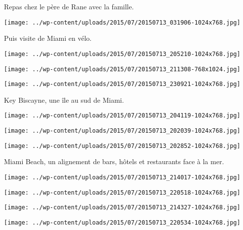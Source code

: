 Repas chez le père de Rane avec la famille. 
\begin{center} \texttt{[image: ../wp-content/uploads/2015/07/20150713\_031906-1024x768.jpg]} \end{center}

Puis visite de Miami en vélo. 
\begin{center} \texttt{[image: ../wp-content/uploads/2015/07/20150713\_205210-1024x768.jpg]} \end{center}
\begin{center} \texttt{[image: ../wp-content/uploads/2015/07/20150713\_211308-768x1024.jpg]} \end{center}
\begin{center} \texttt{[image: ../wp-content/uploads/2015/07/20150713\_230921-1024x768.jpg]} \end{center}

\pagebreak
Key Biscayne, une île au sud de Miami.
\begin{center} \texttt{[image: ../wp-content/uploads/2015/07/20150713\_204119-1024x768.jpg]} \end{center}
\begin{center} \texttt{[image: ../wp-content/uploads/2015/07/20150713\_202039-1024x768.jpg]} \end{center}
\begin{center} \texttt{[image: ../wp-content/uploads/2015/07/20150713\_202852-1024x768.jpg]} \end{center}

Miami Beach, un alignement de bars, hôtels et restaurants face à la mer. 
\begin{center} \texttt{[image: ../wp-content/uploads/2015/07/20150713\_214017-1024x768.jpg]} \end{center}
\begin{center} \texttt{[image: ../wp-content/uploads/2015/07/20150713\_220518-1024x768.jpg]} \end{center}
\begin{center} \texttt{[image: ../wp-content/uploads/2015/07/20150713\_214327-1024x768.jpg]} \end{center}
\begin{center} \texttt{[image: ../wp-content/uploads/2015/07/20150713\_220534-1024x768.jpg]} \end{center}
